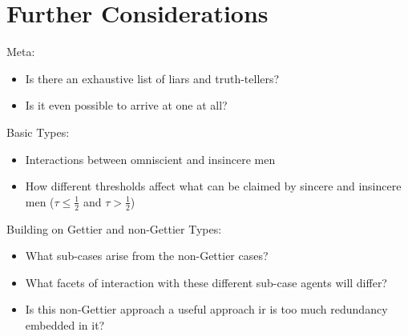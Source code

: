 \documentclass[12pt, titlepage, twoside]{report}
\begin{document}
\chapter{Further Considerations}
Meta:
\begin{itemize}
\item Is there an exhaustive list of liars and truth-tellers?
\item Is it even possible to arrive at one at all?
\end{itemize}
Basic Types:
\begin{itemize}
\item Interactions between omniscient and insincere men
\item How different thresholds affect what can be claimed by sincere and insincere men ($\tau \leq \frac{1}{2}$ and $\tau > \frac{1}{2}$)
\end{itemize}
Building on Gettier and non-Gettier Types:
\begin{itemize}
\item What sub-cases arise from the non-Gettier cases?\item What facets of interaction with these different sub-case agents will differ?
\item Is this non-Gettier approach a useful approach ir is too much redundancy embedded in it?
\end{itemize}



\end{document}
